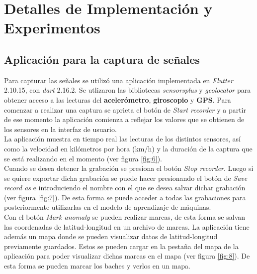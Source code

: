 \chapter{Detalles de Implementación y Experimentos}\label{chapter:implementation}

\section{Aplicación para la captura de señales}
	Para capturar las señales se utilizó una aplicación implementada en \emph{Flutter} 2.10.15, con \emph{dart} 2.16.2.
	Se utlizaron las bibliotecas \emph{sensors\textunderscore plus} y \emph{geolocator} para obtener acceso a las lecturas del \textbf
	{acelerómetro}, \textbf{giroscopio} y \textbf{GPS}. Para comenzar a realizar una captura se aprieta el botón de \emph{Start recorder}
	y a partir de ese momento la aplicación comienza a reflejar los valores que se obtienen de los sensores en la interfaz de usuario.\\
	\indent La aplicación muestra en tiempo real las lecturas de los distintos sensores, así como la velocidad en kilómetros por hora (km/h) y la
	duración de la captura que se está realizando en el momento (ver figura \ref{fig:6}).\\
	\indent Cuando se desea detener la grabación se presiona el botón \emph{Stop recorder}. Luego si se quiere exportar dicha grabación se puede
	hacer presionando el botón de \emph{Save record as} e introduciendo el nombre con el que se desea salvar dichar grabación (ver figura
	\ref{fig:7}). De esta forma se puede acceder a todas las grabaciones para posteriormente utilizarlas en el modelo de aprendizaje de máquinas.\\
	\indent Con el botón \emph{Mark anomaly} se pueden realizar marcas, de esta forma se salvan las coordenadas de latitud-longitud en un
	archivo de marcas. La aplicación tiene además un mapa donde se pueden visualizar datos de latitud-longitud previamente guardados.
	Estos se pueden cargar en la pestaña del mapa de la aplicación para poder visualizar dichas marcas en el mapa (ver figura \ref{fig:8}).
	De esta forma se pueden marcar los baches y verlos en un mapa.\\
	
